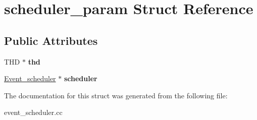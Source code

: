 \hypertarget{structscheduler__param}{}\section{scheduler\+\_\+param Struct Reference}
\label{structscheduler__param}
\subsection*{Public Attributes}
\begin{DoxyCompactItemize}
\item 
\mbox{\label{structscheduler__param_a5f2c671e44478b3aa88ed594771cbbe1}} 
T\+HD $\ast$ {\bfseries thd}
\item 
\mbox{\label{structscheduler__param_a49320adac6ed8e0305c4f6c23e009afa}} 
\mbox{\hyperlink{classEvent__scheduler}{Event\+\_\+scheduler}} $\ast$ {\bfseries scheduler}
\end{DoxyCompactItemize}


The documentation for this struct was generated from the following file\+:\begin{DoxyCompactItemize}
\item 
event\+\_\+scheduler.\+cc\end{DoxyCompactItemize}
